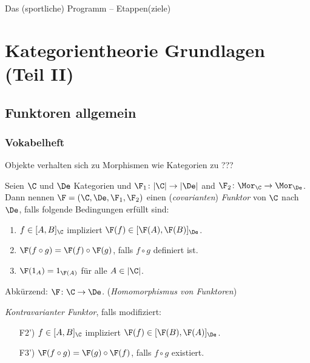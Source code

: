 \documentclass[serif,9pt]{beamer}
\begin{document}
\maketitle

\begin{frame}{Das (sportliche) Programm -- Etappen(ziele)}
  \tableofcontents
\end{frame}


\section{Kategorientheorie Grundlagen (Teil II)}

\subsection{Funktoren allgemein}

\begin{frame}
  \frametitle{Vokabelheft}
  Objekte verhalten sich zu Morphismen wie
  Kategorien zu ???
  \pause
  \begin{defn*}
  Seien $\C$ und $\De$ Kategorien und $\F_1 \colon |\C| \to |\De|$ and $\F_2 \colon \Mor_\C\to \Mor_\De$. 
  Dann nennen $\F = (\C, \De, \F_1, \F_2)$ einen (\emph{covarianten}) \emph{Funktor} von $\C$ nach $\De$, falls folgende Bedingungen erfüllt sind:
  \begin{enumerate}[F1)]
    \item $f \in [A, B]_\C$ impliziert $\F(f) \in [\F(A), \F(B)]_\De$.
    \item $\F(f \circ g) = \F(f) \circ \F(g)$, falls $f \circ g$ definiert ist.
    \item $\F(1_A) = 1_{\F(A)}$ für alle $A \in |\C|$.
  \end{enumerate}
  Abkürzend: $\F \colon \C \to \De$. (\emph{Homomorphismus von Funktoren})

  \pause

  \emph{Kontravarianter Funktor}, falls modifiziert:
\begin{enumerate}[F1')]
  \item[F2')] $f \in [A, B]_\C$ impliziert $\F(f) \in [\F(B), \F(A)]_\De$.
  \item[F3')] $\F(f \circ g) = \F(g) \circ \F(f)$, falls $f \circ g$ existiert.
\end{enumerate}
  \end{defn*}
\end{frame}
\end{document}
